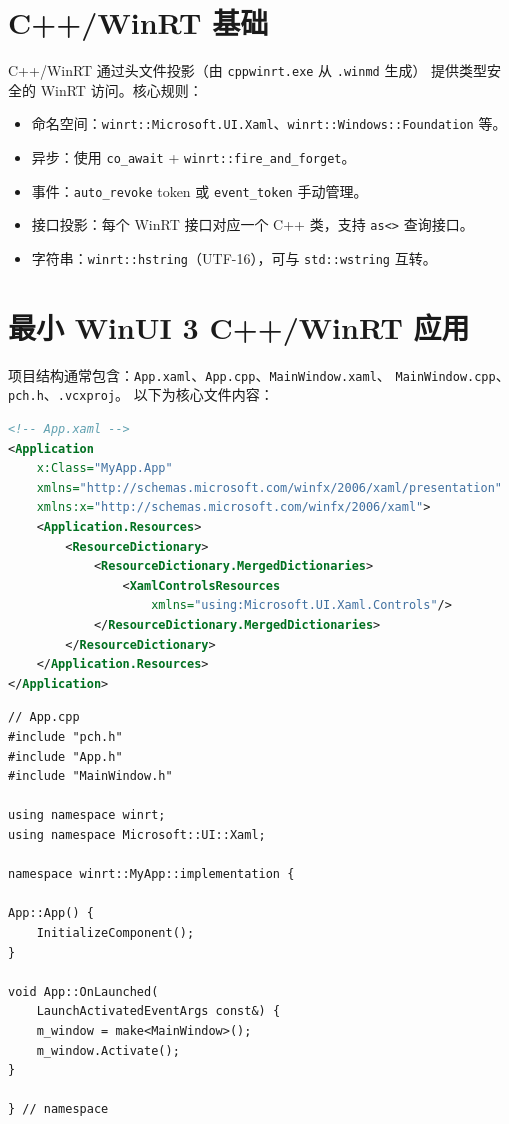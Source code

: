 \documentclass[12pt,a4paper,fontset=fandol]{ctexbook}
\newcommand{\cpplabel}{%
  \tcbox[on line,colback=cppheadbg,colframe=cppheadbg,
    boxrule=0pt,arc=1pt,left=2pt,right=2pt,top=1pt,bottom=1pt,
    colupper=white,fontupper=\scriptsize\bfseries]{C++}}
\newcommand{\xamllabel}{%
  \tcbox[on line,colback=xamlheadbg,colframe=xamlheadbg,
    boxrule=0pt,arc=1pt,left=2pt,right=2pt,top=1pt,bottom=1pt,
    colupper=white,fontupper=\scriptsize\bfseries]{XAML}}
\newcommand{\Tp}[1]{\texttt{#1}}
\begin{document}
\section{C++/WinRT 基础}

C++/WinRT 通过头文件投影（由 \texttt{cppwinrt.exe} 从 \texttt{.winmd} 生成）
提供类型安全的 WinRT 访问。核心规则：

\begin{guideline}[title=C++/WinRT 关键约定]
\begin{itemize}
  \item 命名空间：\Tp{winrt::Microsoft.UI.Xaml}、\Tp{winrt::Windows::Foundation} 等。
  \item 异步：使用 \Tp{co\_await} + \Tp{winrt::fire\_and\_forget}。
  \item 事件：\Tp{auto\_revoke} token 或 \Tp{event\_token} 手动管理。
  \item 接口投影：每个 WinRT 接口对应一个 C++ 类，支持 \Tp{as<>} 查询接口。
  \item 字符串：\Tp{winrt::hstring}（UTF-16），可与 \Tp{std::wstring} 互转。
\end{itemize}
\end{guideline}

\section{最小 WinUI 3 C++/WinRT 应用}

项目结构通常包含：\texttt{App.xaml}、\texttt{App.cpp}、\texttt{MainWindow.xaml}、
\texttt{MainWindow.cpp}、\texttt{pch.h}、\texttt{.vcxproj}。
以下为核心文件内容：

\xamllabel
\begin{lstlisting}[style=xamlstyle,language=XML]
<!-- App.xaml -->
<Application
    x:Class="MyApp.App"
    xmlns="http://schemas.microsoft.com/winfx/2006/xaml/presentation"
    xmlns:x="http://schemas.microsoft.com/winfx/2006/xaml">
    <Application.Resources>
        <ResourceDictionary>
            <ResourceDictionary.MergedDictionaries>
                <XamlControlsResources
                    xmlns="using:Microsoft.UI.Xaml.Controls"/>
            </ResourceDictionary.MergedDictionaries>
        </ResourceDictionary>
    </Application.Resources>
</Application>
\end{lstlisting}

\cpplabel
\begin{lstlisting}[style=cppstyle]
// App.cpp
#include "pch.h"
#include "App.h"
#include "MainWindow.h"

using namespace winrt;
using namespace Microsoft::UI::Xaml;

namespace winrt::MyApp::implementation {

App::App() {
    InitializeComponent();
}

void App::OnLaunched(
    LaunchActivatedEventArgs const&) {
    m_window = make<MainWindow>();
    m_window.Activate();
}

} // namespace
\end{lstlisting}
\end{document}
